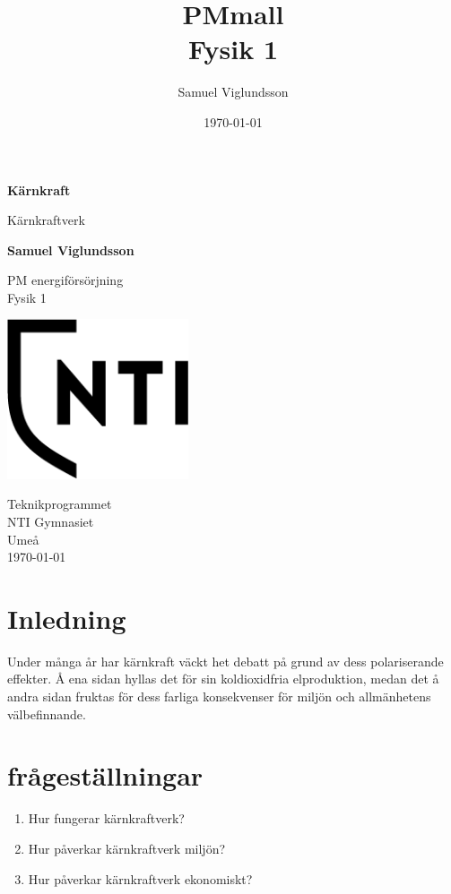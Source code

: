 \documentclass[11p]{article}
\title{PMmall \\ \small Fysik 1}
\author{Samuel Viglundsson}
\date{\today}
\begin{document}
    \begin{titlepage}
        \begin{center}
            \vspace*{1cm}

            \Huge
            \textbf{Kärnkraft}

            \vspace{0.5cm}
            \LARGE
            Kärnkraftverk

            \vspace{1.5cm}

            \textbf{Samuel Viglundsson}

            \vfill

            PM energiförsörjning \\
            Fysik 1

            \vspace{0.8cm}

            \includegraphics[width=0.4\textwidth]{NTI Gymnasiet_Symbol_print_svart.png}

            \Large
            Teknikprogrammet\\
            NTI Gymnasiet\\
            Umeå\\
            \today

        \end{center}
    \end{titlepage}

    \newpage
    \section{Inledning}
    Under många år har kärnkraft väckt het debatt på grund av dess polariserande effekter. Å ena sidan hyllas det för sin koldioxidfria elproduktion, medan det å andra sidan fruktas för dess farliga konsekvenser för miljön och allmänhetens välbefinnande.

    \section{frågeställningar}
    \begin{enumerate}
        \item Hur fungerar kärnkraftverk?
        \item Hur påverkar kärnkraftverk miljön?
        \item Hur påverkar kärnkraftverk ekonomiskt?
    \end{enumerate}
\end{document}
